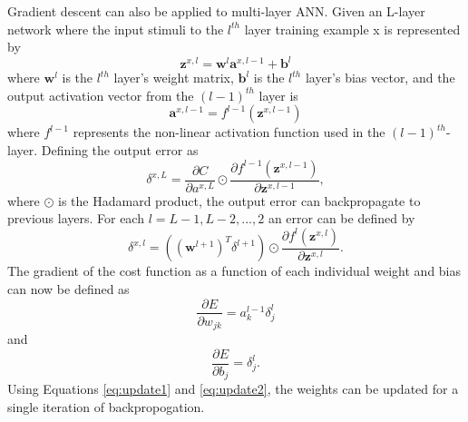 Gradient descent can also be applied to multi-layer ANN. Given an L-layer network where the input stimuli to the $l^{th}$ layer training example x is represented by
%
\begin{equation} \label{eq:CrossEntropy}
\boldsymbol{z}^{x,l} = \boldsymbol{w}^{l}  \boldsymbol{a}^{x,l-1} + \boldsymbol{b}^{l}
\end{equation}
%
where $\boldsymbol{w}^{l}$ is the $l^{th}$ layer's weight matrix, $\boldsymbol{b}^{l}$ is the $l^{th}$ layer's bias vector, and the output activation vector from the $(l-1)^{th}$ layer is 
%
\begin{equation} \label{eq:CrossEntropy}
\boldsymbol{a}^{x,l-1} = f^{l-1}(\boldsymbol{z}^{x,l-1})
\end{equation}
%
where $f^{l-1}$ represents the non-linear activation function used in the $(l-1)^{th}$-layer. Defining the output error as 
%
\begin{equation} \label{eq:CrossEntropy}
\delta^{x,L} = \frac{\partial C}{\partial a^{x,L}} \odot \frac{\partial f^{l-1}(\boldsymbol{z}^{x,l-1}) }{\partial \boldsymbol{z}^{x,l-1}}, 
\end{equation}
%
where $\odot$ is the Hadamard product, the output error can backpropagate to previous layers. For each $l=L-1,L-2,...,2$ an error can be defined by
%
\begin{equation} \label{eq:CrossEntropy}
\delta^{x,l} = ((\boldsymbol{w}^{l+1})^T \delta^{l+1}) \odot \frac{\partial f^{l}(\boldsymbol{z}^{x,l}) }{\partial \boldsymbol{z}^{x,l}}.
\end{equation}
%
The gradient of the cost function as a function of each individual weight and bias can now be defined as 
%
\begin{equation} \label{eq:CrossEntropy1}
\frac{\partial E}{\partial w_{jk}} = a^{l-1}_k \delta^l_j
\end{equation}
%
and 
%
\begin{equation} \label{eq:CrossEntropy2}
\frac{\partial E}{\partial b_j} = \delta^l_j.
\end{equation}
%
Using Equations \ref{eq:update1} and \ref{eq:update2}, the weights can be updated for a single iteration of backpropogation. 




